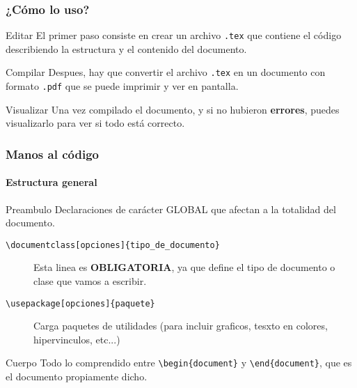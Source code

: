 \documentclass[12pt]{beamer}
\begin{document}
\begin{frame}%
  \frametitle{¿Cómo lo uso?}\pause
  \begin{block}{Editar}
    El primer paso consiste en crear un archivo \texttt{.tex} que contiene el código describiendo la estructura y el contenido del documento.
  \end{block}\pause
  \begin{block}{Compilar}
    Despues, hay que convertir el archivo \texttt{.tex} en un documento con formato \texttt{.pdf} que se puede imprimir y ver en pantalla.
  \end{block}\pause
  \begin{block}{Visualizar}
    Una vez compilado el documento, y si no hubieron \textbf{errores}, puedes visualizarlo para ver si todo está correcto.
  \end{block}
\end{frame}

\begin{frame}%
  \frametitle{Manos al código}
  \framesubtitle{Estructura general}\pause
  \begin{block}{Preambulo}
    Declaraciones de carácter GLOBAL que afectan a la totalidad del documento.
    \begin{description}
    \item[\texttt{\textbackslash documentclass[opciones]\{tipo\_de\_documento\}}]

      Esta linea es \textbf{OBLIGATORIA}, ya que define el tipo de documento o clase que vamos a escribir.

    \item[\texttt{\textbackslash usepackage[opciones]\{paquete\}}]

      Carga paquetes de utilidades (para incluir graficos, tesxto en colores, hipervinculos, etc...)
    \end{description}
  \end{block}\pause
  \begin{block}{Cuerpo}
    Todo lo comprendido entre \texttt{\textbackslash begin\{document\}} y \texttt{\textbackslash end\{document\}}, que es el documento propiamente dicho.
  \end{block}\pause
\end{frame}
\end{document}
